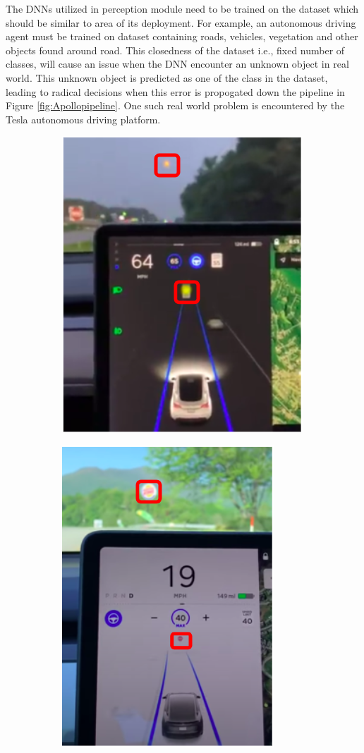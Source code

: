 The DNNs utilized in perception module need to be trained on the dataset which should be similar to area of its deployment.
For example, an autonomous driving agent must be trained on dataset containing roads, vehicles, vegetation and other objects found around road.
This closedness of the dataset i.e., fixed number of classes, will cause an issue when the DNN encounter an unknown object in real world.
This unknown object is predicted as one of the class in the dataset, leading to radical decisions when this error is propogated down the pipeline in Figure \ref{fig:Apollopipeline}.
One such real world problem is encountered by the Tesla autonomous driving platform.
\begin{figure}[h!]
    \begin{subfigure}{0.48\textwidth}
        \centering
        \includegraphics[scale=0.5]{images/tesla_1.png}
        \caption{}
        \label{fig:teslafails_1}
    \end{subfigure}
    \begin{subfigure}{0.48\textwidth}
        \centering
        \includegraphics[scale=0.5]{images/tesla_2.png}

\end{subfigure}
\end{figure}

